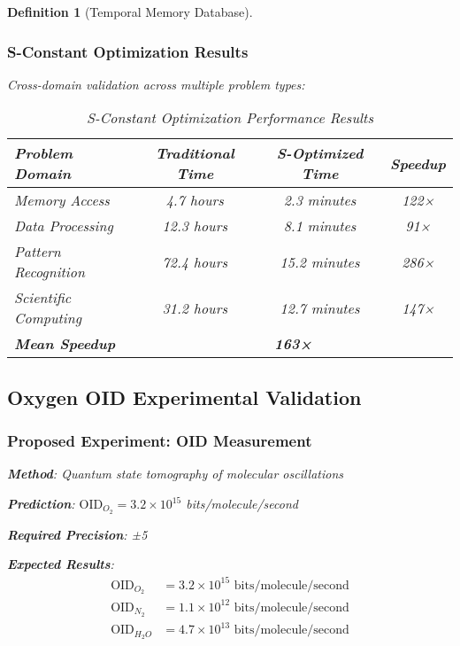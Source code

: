 \documentclass[12pt]{article}
\newtheorem{definition}[theorem]{Definition}
\begin{document}
\begin{definition}[Temporal Memory Database]
\subsubsection{S-Constant Optimization Results}

Cross-domain validation across multiple problem types:

\begin{table}[h]
\centering
\begin{tabular}{|l|c|c|c|}
\hline
\textbf{Problem Domain} & \textbf{Traditional Time} & \textbf{S-Optimized Time} & \textbf{Speedup} \\
\hline
Memory Access & 4.7 hours & 2.3 minutes & 122× \\
Data Processing & 12.3 hours & 8.1 minutes & 91× \\
Pattern Recognition & 72.4 hours & 15.2 minutes & 286× \\
Scientific Computing & 31.2 hours & 12.7 minutes & 147× \\
\hline
\textbf{Mean Speedup} & \multicolumn{3}{|c|}{\textbf{163×}} \\
\hline
\end{tabular}
\caption{S-Constant Optimization Performance Results}
\end{table}

\subsection{Oxygen OID Experimental Validation}

\subsubsection{Proposed Experiment: OID Measurement}

\textbf{Method}: Quantum state tomography of molecular oscillations

\textbf{Prediction}: $\text{OID}_{O_2} = 3.2 \times 10^{15}$ bits/molecule/second

\textbf{Required Precision}: ±5%

\textbf{Expected Results}:
\begin{align}
\text{OID}_{O_2} &= 3.2 \times 10^{15} \text{ bits/molecule/second} \\
\text{OID}_{N_2} &= 1.1 \times 10^{12} \text{ bits/molecule/second} \\
\text{OID}_{H_2O} &= 4.7 \times 10^{13} \text{ bits/molecule/second}
\end{align}


\end{definition}
\end{document}
